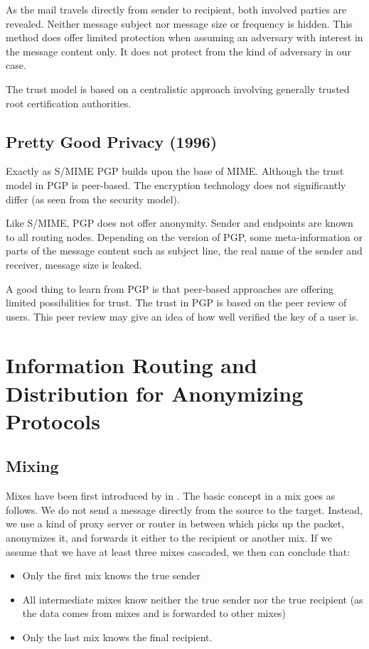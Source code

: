 As the mail travels directly from sender to recipient, both involved parties are revealed. Neither message subject nor message size or frequency is hidden. This method does offer limited protection when assuming an adversary with interest in the message content only. It does not protect from the kind of adversary in our case. 

The trust model is based on a centralistic approach involving generally trusted root certification authorities.

\section{Pretty Good Privacy (1996)}
Exactly as S/MIME PGP\cite{rfc4880} builds upon the base of MIME. Although the trust model in PGP is peer-based. The encryption technology does not significantly differ (as seen from the security model).

Like S/MIME, PGP does not offer anonymity. Sender and endpoints are known to all routing nodes. Depending on the version of PGP, some meta-information or parts of the message content such as subject line, the real name of the sender and receiver, message size is leaked.

A good thing to learn from PGP is that peer-based approaches are offering limited possibilities for trust. The trust in PGP is based on the peer review of users. This peer review may give an idea of how well verified the key of a user is.


\chapter{Information Routing and Distribution for Anonymizing Protocols}

\section{Mixing}
Mixes have been first introduced by \cite{CHAUM1} in \citeyear{CHAUM1}. The basic concept in a mix goes as follows. We do not send a message directly from the source to the target. Instead, we use a kind of proxy server or router in between which picks up the packet, anonymizes it, and forwards it either to the recipient or another mix. If we assume that we have at least three mixes cascaded, we then can conclude that:
\begin{itemize}
	\item Only the first mix knows the true sender
	\item All intermediate mixes know neither the true sender nor the true recipient (as the data comes from mixes and is forwarded to other mixes) 
	\item Only the last mix knows the final recipient.
\end{itemize}

